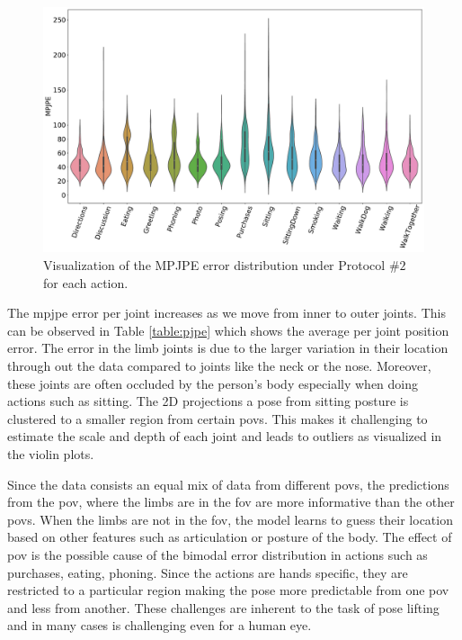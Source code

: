 \begin{figure}[h]
    \centering
    \includegraphics[width=\textwidth]{figures/results/violin_pjpe.pdf}
    \caption{Visualization of the MPJPE error distribution under Protocol $\#2$ for each action.}
    \label{fig:mpjpe_trends}
\end{figure}

The \ac{mpjpe} error per joint increases as we move from inner to outer joints. This can be observed in Table \ref{table:pjpe} which shows the average per joint position error. The error in the limb joints is due to the larger variation in their location through out the data compared to joints like the neck or the nose. Moreover, these joints are often occluded by the person's body especially when doing actions such as sitting. The 2D projections a pose from sitting posture is clustered to a smaller region from certain \acp{pov}. This makes it challenging to estimate the scale and depth of each joint and leads to outliers as visualized in the violin plots.

Since the data consists an equal mix of data from different \acp{pov}, the predictions from the \ac{pov}, where the limbs are in the \ac{fov} are more informative than the other \acp{pov}. When the limbs are not in the \ac{fov}, the model learns to guess their location based on other features such as articulation or posture of the body. The effect of \ac{pov} is the possible cause of the bimodal error distribution in actions such as purchases, eating, phoning. Since the actions are hands specific, they are restricted to a particular region making the pose more predictable from one \ac{pov} and less from another. These challenges are inherent to the task of pose lifting and in many cases is challenging even for a human eye.

